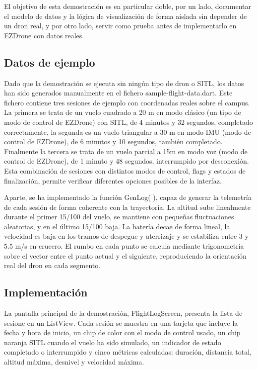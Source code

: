 El objetivo de esta demostración es en particular doble, por un lado, documentar el modelo de datos y la lógica de visualización de forma aislada sin depender de un dron real, y por otro lado, servir como prueba antes de implementarlo en EZDrone con datos reales.

\subsection{Datos de ejemplo}
Dado que la demostración se ejecuta sin ningún tipo de dron o SITL, los datos han sido generados manualmente en el fichero sample-flight-data.dart. Este fichero contiene tres sesiones de ejemplo con coordenadas reales sobre el campus. La primera se trata de un vuelo cuadrado a 20 m en modo clásico (un tipo de modo de control de EZDrone) con SITL, de 4 minutos y 32 segundos, completado correctamente, la segunda es un vuelo triangular a 30 m en modo IMU (modo de control de EZDrone), de 6 minutos y 10 segundos, también completado. Finalmente la tercera se trata de un vuelo parcial a 15m en modo voz (modo de control de EZDrone), de 1 minuto y 48 segundos, interrumpido por desconexión. Esta combinación de sesiones con distintos modos de control, flags y estados de finalización, permite verificar diferentes opciones posibles de la interfaz.

Aparte, se ha implementado la función GenLog( ), capaz de generar la telemetría de cada sesión de forma coherente con la trayectoria. La altitud sube linealmente durante el primer 15/100 del vuelo, se mantiene con pequeñas fluctuaciones aleatorias, y en el último 15/100 baja. La batería decae de forma lineal, la velocidad es baja en los tramos de despegue y aterrizaje y se estabiliza entre 3 y 5.5 m/s en crucero. El rumbo en cada punto se calcula mediante trigonometría sobre el vector entre el punto actual y el siguiente, reproduciendo la orientación real del dron en cada segmento.

\subsection{Implementación}
La pantalla principal de la demostración, FlightLogScreen, presenta la lista de sesione en un ListView. Cada sesión se muestra en una tarjeta que incluye la fecha y hora de inicio, un chip de color con el modo de control usado, un chip naranja SITL cuando el vuelo ha sido simulado, un indicador de estado completado o interrumpido y cinco métricas calculadas: duración, distancia total, altitud máxima, desnivel y velocidad máxima.

